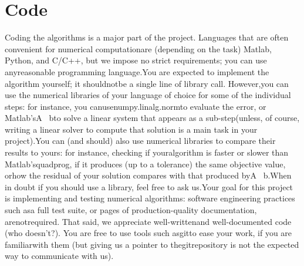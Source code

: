 \section{Code}

Coding the algorithms is a major part of the project. Languages that are often convenient for numerical computationare (depending on the task) Matlab, Python, and C/C++, but we impose no strict requirements; you can use anyreasonable programming language.You are expected to implement the algorithm yourself; it shouldnotbe a single line of library call. However,you can use the numerical libraries of your language of choice for some of the individual steps: for instance, you canusenumpy.linalg.normto evaluate the error, or Matlab’sA \ bto solve a linear system that appears as a sub-step(unless, of course, writing a linear solver to compute that solution is a main task in your project).You can (and should) also use numerical libraries to compare their results to yours: for instance, checking if youralgorithm is faster or slower than Matlab’squadprog, if it produces (up to a tolerance) the same objective value, orhow the residual of your solution compares with that produced byA \ b.When in doubt if you should use a library, feel free to ask us.Your goal for this project is implementing and testing numerical algorithms: software engineering practices such asa full test suite, or pages of production-quality documentation, arenotrequired. That said, we appreciate well-writtenand well-documented code (who doesn’t?). You are free to use tools such asgitto ease your work, if you are familiarwith them (but giving us a pointer to thegitrepository is not the expected way to communicate with us).